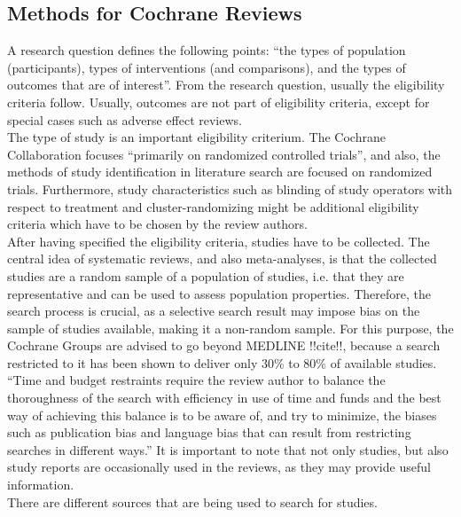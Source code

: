 \subsection{Methods for Cochrane Reviews}
A research question defines the following points: ``the types of population (participants), types of interventions (and comparisons), and the types of outcomes that are of interest''. From the research question, usually the eligibility criteria follow. Usually, outcomes are not part of eligibility criteria, except for special cases such as adverse effect reviews. \\
The type of study is an important eligibility criterium. The Cochrane Collaboration focuses ``primarily on randomized controlled trials'', and also, the methods of study identification in literature search are focused on randomized trials. Furthermore, study characteristics such as blinding of study operators with respect to treatment and cluster-randomizing might be additional eligibility criteria which have to be chosen by the review authors. \\
After having specified the eligibility criteria, studies have to be collected. The central idea of systematic reviews, and also meta-analyses, is that the collected studies are a random sample of a population of studies, i.e. that they are representative and can be used to assess population properties. Therefore, the search process is crucial, as a selective search result may impose bias on the sample of studies available, making it a non-random sample. For this purpose, the Cochrane Groups are advised to go beyond MEDLINE !!cite!!, because a search restricted to it has been shown to deliver only 30\% to 80\% of available studies. ``Time and budget restraints require the review author to balance the thoroughness of the search with efficiency in use of time and funds and the best way of achieving this balance is to be aware of, and try to minimize, the biases such as publication bias and language bias that can result from restricting searches in different ways.'' It is important to note that not only studies, but also study reports are occasionally used in the reviews, as they may provide useful information. \\
There are different sources that are being used to search for studies. 

